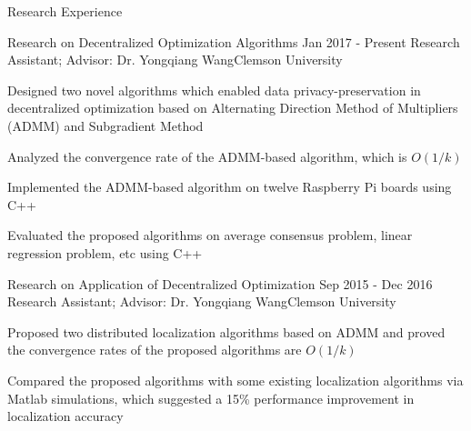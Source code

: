 \documentclass{resume} %
\begin{document}

\begin{rSection}{Research Experience}	
\begin{rSubsection}{Research on Decentralized Optimization Algorithms }
{Jan 2017 - Present }{Research Assistant; Advisor: Dr. Yongqiang Wang}{Clemson University}

 \setlength{\parindent}{2em}
 \item Designed two novel algorithms which enabled data privacy-preservation in decentralized optimization based on Alternating Direction Method of Multipliers (ADMM) and Subgradient Method
\item Analyzed the convergence rate of the ADMM-based algorithm, which is $O(1/k)$
\item Implemented the ADMM-based algorithm on twelve Raspberry Pi boards using C++
\item Evaluated the proposed algorithms on average consensus problem, linear regression problem, etc using C++
\end{rSubsection}	
		

\begin{rSubsection}{Research on Application of Decentralized Optimization}{ Sep 2015 - Dec 2016  }{Research Assistant; Advisor: Dr. Yongqiang Wang}{Clemson University}
       \item Proposed two distributed localization algorithms based on ADMM and proved the convergence rates of the proposed algorithms are $O(1/k)$
		\item Compared the proposed algorithms with some existing localization algorithms via Matlab simulations, which suggested a 15\% performance improvement in localization accuracy 
\end{rSubsection}
\end{rSection}
\end{document}
